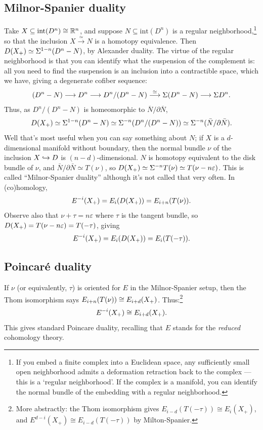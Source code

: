 \subsection*{Milnor-Spanier duality}
Take $X \subseteq \mathrm{int}(D^n) \cong \mathbb{R}^n$, and suppose $N \subseteq \mathrm{int}(D^n)$ is a regular neighborhood,\footnote{If you embed a finite complex into a Euclidean space, any sufficiently small
open neighborhood admits a deformation retraction back to the complex
 --- this is a `regular neighborhood'. If the complex is a manifold,
you can identify the normal bundle of the embedding with a regular
neighborhood. } so that the inclusion $X \stackrel{\simeq}{\to} N$ is a homotopy equivalence.  Then $D(X_+) \simeq \Sigma^{1-n}(D^n - N)$, by Alexander duality.
The virtue of the regular neighborhood is that you can identify what the suspension of the complement is: all you need to find the suspension is an inclusion into a contractible space, which we have, giving a degenerate cofiber sequence:
\[(D^n - N) \longrightarrow D^n \longrightarrow D^n/(D^n - N) \overset{\simeq}{\longrightarrow} \Sigma(D^n - N)\longrightarrow\Sigma D^n.\]
Thus, as $D^n/(D^n-N)$ is homeomorphic to $\overline N/\partial\overline N$,
\[D(X_+)\simeq\Sigma^{1-n}(D^n - N) \simeq \Sigma^{-n}(D^n / (D^n-N)) \simeq \Sigma^{-n}(\bar N / \partial \bar N).\]  Well that's most useful when you can say something about $N$; if $X$ is a $d$-dimensional manifold without boundary, then the normal bundle $\nu$ of the inclusion $X \hookrightarrow D$ is $(n-d)$-dimensional.  $N$ is homotopy equivalent to the disk bundle of $\nu$, and $\bar N / \partial \bar N \simeq T (\nu)$, so $D(X_+) \simeq \Sigma^{-n} T(\nu) \simeq T(\nu - n \varepsilon)$.  This is called ``Milnor-Spanier duality'' although it's not called that very often.  In (co)homology,
\[
E^{-i}(X_+) = E_i (D(X_+)) = E_{i+n} (T (\nu)).
\]
Observe also that $\nu + \tau = n \varepsilon$ where $\tau$ is the tangent bundle, so $D(X_+) = T(\nu - n \varepsilon) = T(-\tau)$, giving
\[
E^{-i}(X_+) = E_i (D(X_+)) = E_{i} (T (-\tau)).
\]
\subsection*{Poincar\'e duality}
If $\nu$ (or equivalently, $\tau$) is oriented for $E$ in the Milnor-Spanier setup, then the Thom isomorphism says $E_{i+n} (T (\nu)) \cong E_{i+d} (X_+)$. Thus:\footnote{More abstractly: the Thom isomorphism gives $E_{i-d}(T(-\tau))\cong E_i(X_+)$, and $E^{d-i}(X_+)\cong E_{i-d}(T(-\tau))$ by Milton-Spanier.}
\[E^{-i} (X_+) \cong E_{i+d} (X_+).\]
This gives standard Poincare duality, recalling that $E$ stands for the \emph{reduced} cohomology theory.

